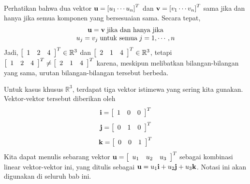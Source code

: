 Perhatikan bahwa dua vektor $\mathbf{u} = \left[ u_{1} \cdots u_{n}\right]^T $ dan
$\mathbf{v}=\left[ v_{1} \cdots v_{n}\right]^T$ sama jika dan hanya jika
semua komponen yang bersesuaian sama. Secara tepat,
\begin{equation*}
\begin{array}{c}
\mathbf{u}=\mathbf{v} \; \mbox{jika dan hanya jika}\\
u_{j}=v_{j} \; \mbox{untuk semua}\; j=1,\cdots ,n
\end{array}
\end{equation*}
Jadi,
$\left[
\begin{array}{rrr}
1  & 2 & 4
\end{array}
\right]^T \in \mathbb{R}^{3}$ dan $\left[
\begin{array}{rrr}
2 & 1 & 4
\end{array}
\right]^T \in
\mathbb{R}^{3}$, tetapi $\left[
\begin{array}{rrr}
1 & 2 & 4
\end{array}
\right]^T \neq \left[
\begin{array}{rrr}
2 & 1 & 4
\end{array}
\right]^T $ karena,
meskipun melibatkan bilangan-bilangan yang sama, urutan bilangan-bilangan tersebut berbeda.

Untuk kasus khusus $\mathbb{R}^3$, terdapat tiga vektor istimewa yang sering kita gunakan.
Vektor-vektor tersebut diberikan oleh
\begin{equation*}
\mathbf{i} =
\left[
\begin{array}{rrr}
1 & 0 & 0
\end{array}
\right]^T
\end{equation*}
\begin{equation*}
\mathbf{j} =
\left[
\begin{array}{rrr}
0 & 1 & 0
\end{array}
\right]^T
\end{equation*}
\begin{equation*}
\mathbf{k} =
\left[
\begin{array}{rrr}
0 & 0 & 1
\end{array}
\right]^T
\end{equation*}
Kita dapat menulis sebarang vektor $\mathbf{u} =
\left[
\begin{array}{rrr}
u_1 & u_2 & u_3
\end{array}
\right]^T$
sebagai kombinasi linear vektor-vektor ini, yang ditulis sebagai $\mathbf{u} = u_1 \mathbf{i} + u_2 \mathbf{j} + u_3 \mathbf{k}$. Notasi ini akan digunakan di seluruh
bab ini.
